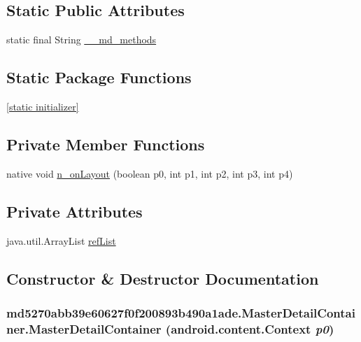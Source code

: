 \subsection*{Static Public Attributes}
\begin{CompactItemize}
\item 
static final String \hyperlink{classmd5270abb39e60627f0f200893b490a1ade_1_1_master_detail_container_c82bf846b500c62b8736305937c47350}{\_\-\_\-md\_\-methods}
\end{CompactItemize}
\subsection*{Static Package Functions}
\begin{CompactItemize}
\item 
\hyperlink{classmd5270abb39e60627f0f200893b490a1ade_1_1_master_detail_container_cebd9434aa87b66b80bc49340b38a40d}{\mbox{[}static initializer\mbox{]}}
\end{CompactItemize}
\subsection*{Private Member Functions}
\begin{CompactItemize}
\item 
native void \hyperlink{classmd5270abb39e60627f0f200893b490a1ade_1_1_master_detail_container_0582c744ccf98d251edbc86dec6b8feb}{n\_\-onLayout} (boolean p0, int p1, int p2, int p3, int p4)
\end{CompactItemize}
\subsection*{Private Attributes}
\begin{CompactItemize}
\item 
java.util.ArrayList \hyperlink{classmd5270abb39e60627f0f200893b490a1ade_1_1_master_detail_container_c49f1f25904383f281279d9ee9f9fba0}{refList}
\end{CompactItemize}


\subsection{Constructor \& Destructor Documentation}
\hypertarget{classmd5270abb39e60627f0f200893b490a1ade_1_1_master_detail_container_9807f2073f88d818e7daa1d67838ea41}{
\subsubsection[{MasterDetailContainer}]{\setlength{\rightskip}{0pt plus 5cm}md5270abb39e60627f0f200893b490a1ade.MasterDetailContainer.MasterDetailContainer (android.content.Context {\em p0})}}
\label{classmd5270abb39e60627f0f200893b490a1ade_1_1_master_detail_container_9807f2073f88d818e7daa1d67838ea41}




